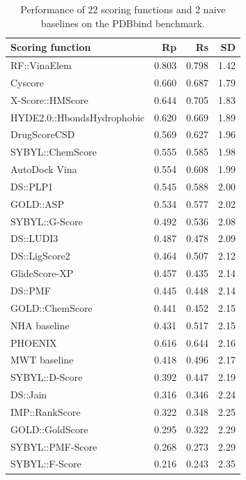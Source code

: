 \begin{table}
\caption{Performance of 22 scoring functions and 2 naive baselines on the PDBbind benchmark.}
\label{rfscore3:trn1105tst195}
\begin{tabular}{lrrr}
\hline
Scoring function & Rp & Rs & SD\\
\hline
RF::VinaElem               & 0.803 & 0.798 & 1.42\\
Cyscore                    & 0.660 & 0.687 & 1.79\\
X-Score::HMScore           & 0.644 & 0.705 & 1.83\\
HYDE2.0::HbondsHydrophobic & 0.620 & 0.669 & 1.89\\
DrugScoreCSD               & 0.569 & 0.627 & 1.96\\
SYBYL::ChemScore           & 0.555 & 0.585 & 1.98\\
AutoDock Vina              & 0.554 & 0.608 & 1.99\\
DS::PLP1                   & 0.545 & 0.588 & 2.00\\
GOLD::ASP                  & 0.534 & 0.577 & 2.02\\
SYBYL::G-Score             & 0.492 & 0.536 & 2.08\\
DS::LUDI3                  & 0.487 & 0.478 & 2.09\\
DS::LigScore2              & 0.464 & 0.507 & 2.12\\
GlideScore-XP              & 0.457 & 0.435 & 2.14\\
DS::PMF                    & 0.445 & 0.448 & 2.14\\
GOLD::ChemScore            & 0.441 & 0.452 & 2.15\\
NHA baseline               & 0.431 & 0.517 & 2.15\\
PHOENIX                    & 0.616 & 0.644 & 2.16\\
MWT baseline               & 0.418 & 0.496 & 2.17\\
SYBYL::D-Score             & 0.392 & 0.447 & 2.19\\
DS::Jain                   & 0.316 & 0.346 & 2.24\\
IMP::RankScore             & 0.322 & 0.348 & 2.25\\
GOLD::GoldScore            & 0.295 & 0.322 & 2.29\\
SYBYL::PMF-Score           & 0.268 & 0.273 & 2.29\\
SYBYL::F-Score             & 0.216 & 0.243 & 2.35\\
\hline
\end{tabular}
\end{table}

